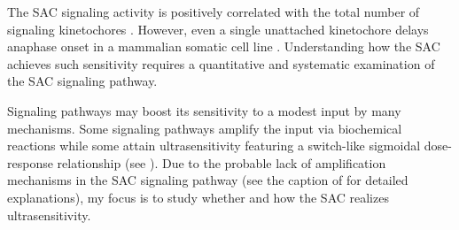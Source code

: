 The SAC signaling activity is positively correlated with the total number of signaling kinetochores \cite{RiederNormalProgression, Rheostat, Ablation}. However, even a single unattached kinetochore delays anaphase onset in a mammalian somatic cell line \cite{PtK1SingleUnattachedKT}. Understanding how the SAC achieves such sensitivity requires a quantitative and systematic examination of the SAC signaling pathway.

Signaling pathways may boost its sensitivity to a modest input by many mechanisms. Some signaling pathways amplify the input via biochemical reactions while some attain ultrasensitivity featuring a switch-like sigmoidal dose-response relationship (see ). Due to the probable lack of amplification mechanisms in the SAC signaling pathway (see the caption of  for detailed explanations), my focus is to study whether and how the SAC realizes ultrasensitivity.

